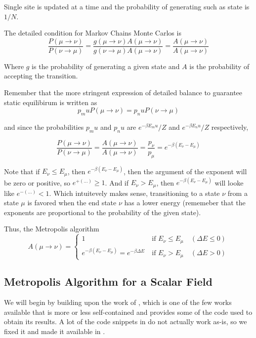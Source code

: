 Single site is updated at a time and the probability of generating such as state is $1/N$.

The detailed condition for Markov Chains Monte Carlos is
$$
\frac{P(\mu \rightarrow \nu)}{P(\nu \rightarrow \mu)}
= \frac{g(\mu \rightarrow \nu) A(\mu \rightarrow \nu)}{g(\nu \rightarrow \mu) A(\mu \rightarrow \nu)}
= \frac{A(\mu \rightarrow \nu)}{A(\mu \rightarrow \nu)}
$$

Where $g$ is the probability of generating a given state and $A$ is the probability of accepting the transition.

Remember that the more stringent expression of detailed balance to guarantee static equilibirum is written as
$$
p_mu P(\mu\rightarrow\nu) = p_nu P(\nu\rightarrow\mu)
$$

and since the probabilities $p_mu$ and $p_nu$ are $e^{-\beta E_mu}/Z$ and $e^{-\beta E_nu}/Z$ respectively,

$$
\frac{P(\mu \rightarrow \nu)}{P(\nu \rightarrow \mu)}
= \frac{A(\mu \rightarrow \nu)}{A(\mu \rightarrow \nu)}
= \frac{p_\nu}{p_\mu}
= e^{-\beta (E_\nu - E_\mu)}
$$

Note that if $E_\nu \leq E_\mu$, then $e^{-\beta (E_\nu - E_\mu)}$, then the argument of the exponent will be zero
or positive, so $e^{+(\ldots)} \geq 1$.
And if $E_\nu > E_\mu$, then $e^{-\beta (E_\nu - E_\mu)}$ will looke like $e^{-(\ldots)} < 1$.
Which intuitevely makes sense, transitioning to a state $\nu$ from a state $\mu$ is favored when
the end state $\nu$ has a lower energy (rememeber that the exponents are proportional to the probability of the given state).

Thus, the Metropolis algorithm 
$$
A(\mu \rightarrow \nu)
=
\begin{cases}
    1                                                    & \text{if } E_\nu \leq E_\mu \quad(\Delta E \leq 0) \\
    e^{-\beta (E_\nu - E_\mu)} = e^{-\beta \Delta E} \   & \text{if } E_\nu > E_\mu \quad(\Delta E > 0)
\end{cases}
$$



\subsection{Metropolis Algorithm for a Scalar Field}

We will begin by building upon the work of \cite{david-lattice-qft}, which is one of the few works available that is more or
less self-contained and provides some of the code used to obtain its results.
A lot of the code snippets in \cite{david-lattice-qft} do not actually work as-is, so we fixed it and made it
available in \cite{our-phi-4}.

